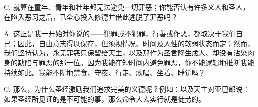 C. 就算在童年、青年和壮年都无法避免一切罪恶；你能否认有许多义人和圣人，在陷入恶习之后，已全心投入修德并借此逃脱了罪恶吗？\par

A. 这正是我一开始对你说的——犯罪或不犯罪，行善或作恶，都取决于我们自己；因此，自由意志得以保存，但须视情况、时间及人性的软弱状态而定；然而，我们坚持认为，永无罪恶只保留给天主，以及那作为圣言降生成人、却没有沾染肉身的缺陷与罪恶的那一位。因为我能在短时间内避免罪恶，你不能逻辑地推断我能持续如此。我能不断地禁食、守夜、行走、歌唱、坐着、睡觉吗？\par

C. 那么，为什么圣经激励我们追求完美的义德呢？例如：以及天主对亚巴郎说：如果圣经所见证的是不可能的事，那么命令人去实行就是徒劳的。\par

